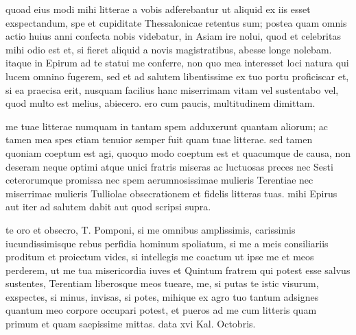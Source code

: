 


 quoad eius modi mihi litterae a vobis adferebantur ut aliquid ex iis esset exspectandum, spe et cupiditate Thessalonicae retentus sum; postea quam omnis actio huius anni confecta nobis videbatur, in Asiam ire nolui, quod et celebritas mihi odio est et, si fieret aliquid a novis magistratibus, abesse longe nolebam. itaque in Epirum ad te statui me conferre, non quo mea interesset loci natura qui lucem omnino fugerem, sed et ad salutem libentissime ex tuo portu proficiscar et, si ea praecisa erit, nusquam facilius hanc miserrimam vitam vel sustentabo vel, quod multo est melius, abiecero. ero cum paucis, multitudinem dimittam.

 me tuae litterae numquam in tantam spem adduxerunt quantam aliorum; ac tamen mea spes etiam tenuior semper fuit quam tuae litterae. sed tamen quoniam coeptum est agi, quoquo modo coeptum est et quacumque de causa, non deseram neque optimi atque unici fratris miseras ac luctuosas preces nec Sesti ceterorumque promissa nec spem aerumnosissimae mulieris Terentiae nec miserrimae mulieris Tulliolae obsecrationem et fidelis litteras tuas. mihi Epirus aut iter ad salutem dabit aut quod scripsi supra.

 te oro et obsecro, T. Pomponi, si me omnibus amplissimis, carissimis iucundissimisque rebus perfidia hominum spoliatum, si me a meis consiliariis proditum et proiectum vides, si intellegis me coactum ut ipse me et meos perderem, ut me tua misericordia iuves et Quintum fratrem qui potest esse salvus sustentes, Terentiam liberosque meos tueare, me, si putas te istic visurum, exspectes, si minus, invisas, si potes, mihique ex agro tuo tantum adsignes quantum meo corpore occupari potest, et pueros ad me cum litteris quam primum et quam saepissime mittas. data xvi Kal. Octobris.

